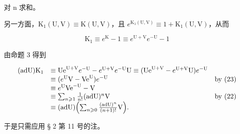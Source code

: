对 n 求和。

另一方面，\(\mathrm{K}_1(\mathrm{U},\mathrm{V})\equiv \mathrm{K}(\mathrm{U},\mathrm{V})\)，且 \(e^{\mathrm{K}_1(\mathrm{U},\mathrm{V})}\equiv 1 + \mathrm{K}_1(\mathrm{U},\mathrm{V})\)，从而

\[
\mathrm{K} _ {1} \equiv e ^ {\mathrm{K}} - 1 \equiv e ^ {\mathrm{U} + \mathrm{V}} e ^ {- \mathrm{U}} - 1
\]

由命题 3 得到

\[
\begin{array}{r l r} (\mathrm{adU}) \mathrm{K} _ {1} & \equiv \mathrm{Ue} ^ {\mathrm{U} + \mathrm{V}} e ^ {- \mathrm{U}} - e ^ {\mathrm{U} + \mathrm{V}} e ^ {- \mathrm{U}} \mathrm{U} \equiv (\mathrm{Ue} ^ {\mathrm{U} + \mathrm{V}} - e ^ {\mathrm{U} + \mathrm{V}} \mathrm{U}) e ^ {- \mathrm{U}} \\ & \equiv (e ^ {\mathrm{U}} \mathrm{V} - \mathrm{Ve} ^ {\mathrm{U}}) e ^ {- \mathrm{U}} & \text {by (23)} \\ & \equiv e ^ {\mathrm{U}} \mathrm{Ve} ^ {- \mathrm{U}} - \mathrm{V} \\ & \equiv \sum_ {n \geqslant 1} \frac {1}{n !} (\mathrm{adU}) ^ {n} \mathrm{V} & \text {by (22)} \\ & \equiv (\mathrm{adU}) \Bigl (\sum_ {n \geqslant 0} \frac {(\mathrm{adU}) ^ {n}}{(n + 1) !} \mathrm{V} \Bigr). \end{array}
\]

于是只需应用 § 2 第 11 号的注。

